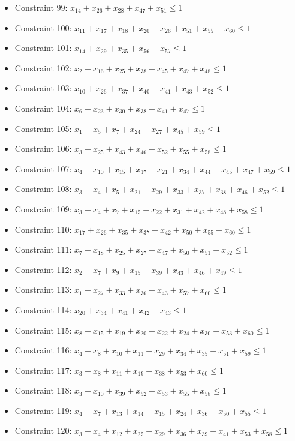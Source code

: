 \documentclass[11pt]{article}
\begin{document}
\begin{itemize}
\item Constraint 99: $x_{14} + x_{26} + x_{28} + x_{47} + x_{51} \le 1$
\item Constraint 100: $x_{11} + x_{17} + x_{18} + x_{20} + x_{26} + x_{51} + x_{55} + x_{60} \le 1$
\item Constraint 101: $x_{14} + x_{29} + x_{35} + x_{56} + x_{57} \le 1$
\item Constraint 102: $x_{2} + x_{16} + x_{25} + x_{38} + x_{45} + x_{47} + x_{48} \le 1$
\item Constraint 103: $x_{10} + x_{26} + x_{37} + x_{40} + x_{41} + x_{43} + x_{52} \le 1$
\item Constraint 104: $x_{6} + x_{23} + x_{30} + x_{38} + x_{41} + x_{47} \le 1$
\item Constraint 105: $x_{1} + x_{5} + x_{7} + x_{24} + x_{27} + x_{45} + x_{59} \le 1$
\item Constraint 106: $x_{3} + x_{25} + x_{43} + x_{46} + x_{52} + x_{55} + x_{58} \le 1$
\item Constraint 107: $x_{4} + x_{10} + x_{15} + x_{17} + x_{21} + x_{34} + x_{44} + x_{45} + x_{47} + x_{59} \le 1$
\item Constraint 108: $x_{3} + x_{4} + x_{5} + x_{21} + x_{29} + x_{33} + x_{37} + x_{38} + x_{46} + x_{52} \le 1$
\item Constraint 109: $x_{3} + x_{4} + x_{7} + x_{15} + x_{22} + x_{31} + x_{42} + x_{48} + x_{58} \le 1$
\item Constraint 110: $x_{17} + x_{26} + x_{35} + x_{37} + x_{42} + x_{50} + x_{55} + x_{60} \le 1$
\item Constraint 111: $x_{7} + x_{18} + x_{25} + x_{27} + x_{47} + x_{50} + x_{51} + x_{52} \le 1$
\item Constraint 112: $x_{2} + x_{7} + x_{9} + x_{15} + x_{39} + x_{43} + x_{46} + x_{49} \le 1$
\item Constraint 113: $x_{1} + x_{27} + x_{33} + x_{36} + x_{43} + x_{57} + x_{60} \le 1$
\item Constraint 114: $x_{20} + x_{34} + x_{41} + x_{42} + x_{43} \le 1$
\item Constraint 115: $x_{8} + x_{15} + x_{19} + x_{20} + x_{22} + x_{24} + x_{30} + x_{53} + x_{60} \le 1$
\item Constraint 116: $x_{4} + x_{8} + x_{10} + x_{11} + x_{29} + x_{34} + x_{35} + x_{51} + x_{59} \le 1$
\item Constraint 117: $x_{3} + x_{8} + x_{11} + x_{19} + x_{38} + x_{53} + x_{60} \le 1$
\item Constraint 118: $x_{3} + x_{10} + x_{39} + x_{52} + x_{53} + x_{55} + x_{58} \le 1$
\item Constraint 119: $x_{4} + x_{7} + x_{13} + x_{14} + x_{15} + x_{24} + x_{36} + x_{50} + x_{55} \le 1$
\item Constraint 120: $x_{3} + x_{4} + x_{12} + x_{25} + x_{29} + x_{36} + x_{39} + x_{41} + x_{53} + x_{58} \le 1$
\end{itemize}
\end{document}
